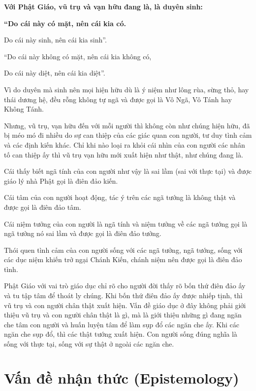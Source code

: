{\bf Với Phật Giáo, vũ trụ và vạn hữu đang là, là duyên sinh:}


{\bf ``Do cái này có mặt, nên cái kia có.

Do cái này sinh, nên cái kia sinh''.

``Do cái này không có mặt, nên cái kia không có,

Do cái này diệt, nên cái kia diệt''.}

Vì do duyên mà sinh nên mọi hiện hữu dù là ý niệm như lông rùa, sừng thỏ, hay thái dương hệ, đều rỗng không tự ngã và được gọi là Vô Ngã, Vô Tánh hay Không Tánh.

Nhưng, vũ trụ, vạn hữu đến với mỗi người thì không còn như chúng hiện hữu, đã bị méo mó đi nhiều do sự can thiệp của các giác quan con người, tư duy tình cảm và các định kiến khác. Chỉ khi nào loại ra khỏi cái nhìn của con người các nhân tố can thiệp ấy thì vũ trụ vạn hữu mới xuất hiện như thật, như chúng đang là.

Cái thấy biết ngã tính của con người như vậy là sai lầm (sai với thực tại) và được giáo lý nhà Phật gọi là điên đảo kiến.

Cái tâm của con người hoạt động, tác ý trên các ngã tướng là không thật và được gọi là điên đảo tâm.

Cái niệm tưởng của con người là ngã tính và niệm tưởng về các ngã tướng gọi là ngã tưởng nó sai lầm và được gọi là điên đảo tưởng.

Thói quen tình cảm của con người sống với các ngã tưởng, ngã tướng, sống với các dục niệm khiến trở ngại Chánh Kiến, chánh niệm nên được gọi là điên đảo tình.

Phật Giáo với vai trò giáo dục chỉ rõ cho người đời thấy rõ bốn thứ điên đảo ấy và tu tập tâm để thoát ly chúng. Khi bốn thứ điên đảo ấy được nhiếp tịnh, thì vũ trụ và con người chân thật xuất hiện. Vấn đề giáo dục ở đây không phải giới thiệu vũ trụ và con người chân thật là gì, mà là giới thiệu những gì đang ngăn che tâm con người và huấn luyện tâm để làm sụp đổ các ngăn che ấy. Khi các ngăn che sụp đổ, thì các thật tướng xuất hiện. Con người sống đúng nghĩa là sống với thực tại, sống với sự thật ở ngoài các ngăn che.


\section{Vấn đề nhận thức (Epistemology)} %
\label{sec:van_de_nhan_thuc}

